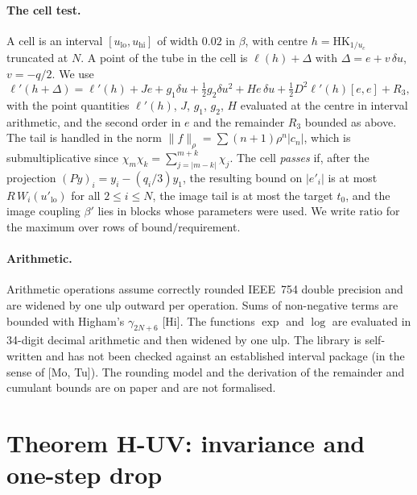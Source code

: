 \documentclass[11pt,a4paper]{article}
\theoremstyle{definition}
\theoremstyle{remark}
\newcommand{\HK}{\mathrm{HK}}
\begin{document}
\paragraph{The cell test.}
A cell is an interval $[u_{\mathrm{lo}},u_{\mathrm{hi}}]$ of width $0.02$ in $\beta$, with centre $h=\HK_{1/u_c}$ truncated at $N$.
A point of the tube in the cell is $\ell(h)+\Delta$ with $\Delta=e+v\,\delta u$, $v=-q/2$.
We use
\begin{equation}\label{eq:taylor}
\ell'(h+\Delta)=\ell'(h)+Je+g_1\delta u+\tfrac12g_2\delta u^2+He\,\delta u+\tfrac12D^2\ell'(h)[e,e]+R_3,
\end{equation}
with the point quantities $\ell'(h)$, $J$, $g_1$, $g_2$, $H$ evaluated at the centre in interval arithmetic, and the second order in $e$ and the remainder $R_3$ bounded as above.
The tail is handled in the norm $\|f\|_\rho=\sum(n+1)\rho^n|c_n|$, which is submultiplicative since $\chi_m\chi_k=\sum_{j=|m-k|}^{m+k}\chi_j$.
The cell \emph{passes} if, after the projection $(Py)_i=y_i-(q_i/3)y_1$, the resulting bound on $|e'_i|$ is at most $R\,W_i(u'_{\mathrm{lo}})$ for all $2\le i\le N$, the image tail is at most the target $t_0$, and the image coupling $\beta'$ lies in blocks whose parameters were used.
We write $\mathrm{ratio}$ for the maximum over rows of bound$/$requirement.

\paragraph{Arithmetic.}
Arithmetic operations assume correctly rounded IEEE~754 double precision and are widened by one ulp outward per operation.
Sums of non-negative terms are bounded with Higham's $\gamma_{2N+6}$ [Hi].
The functions $\exp$ and $\log$ are evaluated in 34-digit decimal arithmetic and then widened by one ulp.
The library is self-written and has not been checked against an established interval package (in the sense of [Mo, Tu]).
The rounding model and the derivation of the remainder and cumulant bounds are on paper and are not formalised.

\section{Theorem H-UV: invariance and one-step drop}\label{sec:huv}
\end{document}

